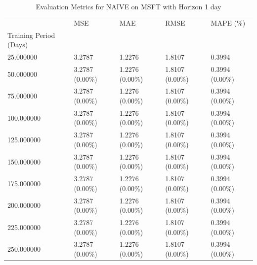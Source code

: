 \begin{table}
\caption{Evaluation Metrics for NAIVE on MSFT with Horizon 1 day}
\label{tab:naive_MSFT_h1_metrics}
\begin{tabular}{lllll}
\toprule
 & MSE & MAE & RMSE & MAPE (\%) \\
Training Period (Days) &  &  &  &  \\
\midrule
25.000000 & 3.2787 & 1.2276 & 1.8107 & 0.3994 \\
50.000000 & 3.2787 (0.00\%) & 1.2276 (0.00\%) & 1.8107 (0.00\%) & 0.3994 (0.00\%) \\
75.000000 & 3.2787 (0.00\%) & 1.2276 (0.00\%) & 1.8107 (0.00\%) & 0.3994 (0.00\%) \\
100.000000 & 3.2787 (0.00\%) & 1.2276 (0.00\%) & 1.8107 (0.00\%) & 0.3994 (0.00\%) \\
125.000000 & 3.2787 (0.00\%) & 1.2276 (0.00\%) & 1.8107 (0.00\%) & 0.3994 (0.00\%) \\
150.000000 & 3.2787 (0.00\%) & 1.2276 (0.00\%) & 1.8107 (0.00\%) & 0.3994 (0.00\%) \\
175.000000 & 3.2787 (0.00\%) & 1.2276 (0.00\%) & 1.8107 (0.00\%) & 0.3994 (0.00\%) \\
200.000000 & 3.2787 (0.00\%) & 1.2276 (0.00\%) & 1.8107 (0.00\%) & 0.3994 (0.00\%) \\
225.000000 & 3.2787 (0.00\%) & 1.2276 (0.00\%) & 1.8107 (0.00\%) & 0.3994 (0.00\%) \\
250.000000 & 3.2787 (0.00\%) & 1.2276 (0.00\%) & 1.8107 (0.00\%) & 0.3994 (0.00\%) \\
\bottomrule
\end{tabular}
\end{table}
